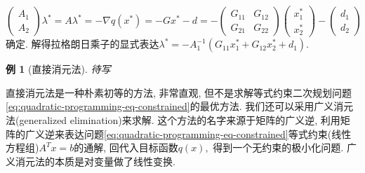 \documentclass{SBCbookchapter}
\newtheorem{eg}[thm]{例}
\begin{document}
\begin{equation*}
\begin{pmatrix} A_1 \\ A_2 \end{pmatrix} \lambda^* = A \lambda^* = -\nabla q(x^*) = - G x^* - d = - \begin{pmatrix} G_{11} & G_{12} \\ G_{21} & G_{22} \end{pmatrix} \begin{pmatrix} x_1^* \\ x_2^* \end{pmatrix} - \begin{pmatrix} d_1 \\ d_2 \end{pmatrix}
\end{equation*}
确定. 解得拉格朗日乘子的显式表达$\lambda^* = -A_1^{-1} \left( G_{11}x_1^* + G_{12}x_2^* + d_1 \right).$

\begin{eg}[直接消元法]
\label{eg:7.2.1}
待写
\end{eg}

直接消元法是一种朴素初等的方法, 非常直观, 但不是求解等式约束二次规划问题\eqref{eq:quadratic-programming-eq-constrained}的最优方法. 我们还可以采用广义消元法(generalized elimination)来求解. 这个方法的名字来源于矩阵的广义逆, 利用矩阵的广义逆来表达问题\eqref{eq:quadratic-programming-eq-constrained}等式约束(线性方程组)$A^T x = b$的通解, 回代入目标函数$q(x),$ 得到一个无约束的极小化问题. 广义消元法的本质是对变量做了线性变换.
\end{document}
